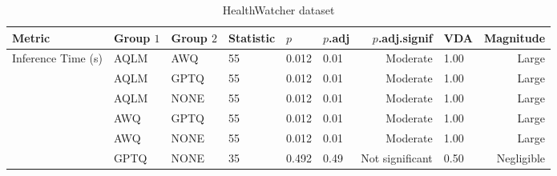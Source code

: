 \begin{table}[ht]
\centering
\caption*{HealthWatcher dataset}
\begin{tabular}{llllllrlr}
\toprule
Metric & Group $1$ & Group $2$ & Statistic & $p$ & $p$.adj & $p$.adj.signif & VDA & Magnitude\\
\midrule
Inference Time (s) & AQLM & AWQ & 55 & 0.012 & 0.01 & Moderate & 1.00 & Large \\
\phantom & AQLM & GPTQ & 55 & 0.012 & 0.01 & Moderate & 1.00 & Large \\
\phantom & AQLM & NONE & 55 & 0.012 & 0.01 & Moderate & 1.00 & Large \\
\phantom & AWQ & GPTQ & 55 & 0.012 & 0.01 & Moderate & 1.00 & Large \\
\phantom & AWQ & NONE & 55 & 0.012 & 0.01 & Moderate & 1.00 & Large \\
\phantom & GPTQ & NONE & 35 & 0.492 & 0.49 & Not significant & 0.50 & Negligible \\
\bottomrule
\end{tabular}
\label{tab:RQ2_posthoc_full}
\end{table}
